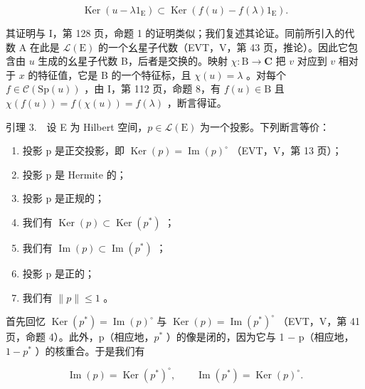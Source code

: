 \[
\operatorname{Ker} (u - \lambda 1 _ {\mathrm{E}}) \subset \operatorname{Ker} (f (u) - f (\lambda) 1 _ {\mathrm{E}}).
\]

其证明与 I，第 128 页，命题 1 的证明类似；我们复述其论证。同前所引入的代数 A 在此是 \(\mathcal{L}(\mathrm{E})\) 的一个幺星子代数（EVT，V，第 43 页，推论）。因此它包含由 \(u\) 生成的幺星子代数 B，后者是交换的。映射 \(\chi: \mathrm{B} \to \mathbf{C}\) 把 \(v\) 对应到 \(v\) 相对于 \(x\) 的特征值，它是 B 的一个特征标，且 \(\chi(u) = \lambda\) 。对每个 \(f \in \mathcal{C}(\mathrm{Sp}(u))\) ，由 I，第 112 页，命题 8，有 \(f(u) \in \mathrm{B}\) 且 \(\chi(f(u)) = f(\chi(u)) = f(\lambda)\) ，断言得证。

引理 3.　设 E 为 Hilbert 空间，\(p \in \mathcal{L}(\mathrm{E})\) 为一个投影。下列断言等价：

\begin{enumerate}
\def\labelenumi{(\roman{enumi})}
\item
  投影 p 是正交投影，即 \(\operatorname{Ker}(p)=\operatorname{Im}(p)^{\circ}\) （EVT，V，第 13 页）；
\item
  投影 p 是 Hermite 的；
\item
  投影 p 是正规的；
\item
  我们有 \(\operatorname{Ker}(p) \subset \operatorname{Ker}(p^*)\) ；
\item
  我们有 \(\operatorname{Im}(p) \subset \operatorname{Im}(p^*)\) ；
\item
  投影 p 是正的；
\item
  我们有 \(\| p\| \leqslant 1\) 。
\end{enumerate}

首先回忆 \(\operatorname{Ker}(p^{*}) = \operatorname{Im}(p)^{\circ}\) 与 \(\operatorname{Ker}(p) = \operatorname{Im}(p^{*})^{\circ}\) （EVT，V，第 41 页，命题 4）。此外，p（相应地，\(p^{*}\) ）的像是闭的，因为它与 1 − p（相应地，\(1 - p^{*}\) ）的核重合。于是我们有

\[
\operatorname{Im} (p) = \operatorname{Ker} (p ^ {*}) ^ {\circ}, \qquad \operatorname{Im} (p ^ {*}) = \operatorname{Ker} (p) ^ {\circ}.\tag{1}
\]

